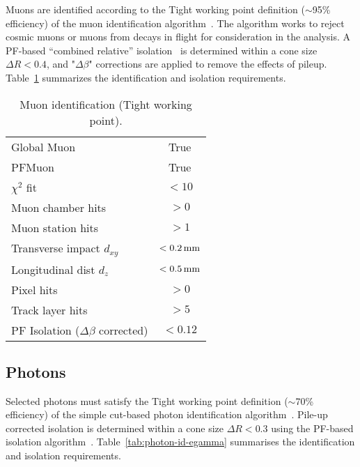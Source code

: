 Muons are identified according to the Tight working point definition
($\sim$95\% efficiency) of the muon identification
algorithm~\cite{ref:muon-id}. The algorithm works to reject cosmic muons or 
muons from decays in flight for consideration in the analysis. 
A PF-based ``combined relative'' isolation~\cite{ref:muon-id} is determined 
within a cone size $\Delta R < 0.4$, and "$\Delta\beta$" corrections 
are applied to remove the effects of pileup. Table~\ref{tab:muon-id} summarizes the
identification and isolation requirements. 

\begin{table}[h!]
  \caption{Muon identification (Tight working point).\label{tab:muon-id}}
  \centering
  \footnotesize
  \begin{tabular}{ lc }
    \hline
    \hline
    Global Muon                            & True      \\
    PFMuon                                 & True      \\
    $\chi^{2}$ fit                         & $<10$     \\
    Muon chamber hits                      & $>0$      \\
    Muon station hits                      & $>1$      \\
    Transverse impact $d_{xy}$             & $<0.2\,\text{mm}$ \\
    Longitudinal dist $d_{z}$              & $<0.5\,\text{mm}$ \\
    Pixel hits                             & $>0$      \\
    Track layer hits                       & $>5$      \\
    PF Isolation ($\Delta\beta$ corrected) & $<0.12$   \\
    \hline
    \hline
  \end{tabular}
\end{table}

\subsection{Photons}
%
Selected photons must satisfy the Tight working point definition 
($\sim$70\% efficiency) of the simple cut-based photon identification
algorithm~\cite{ref:photon-id-egamma}. Pile-up corrected isolation is 
determined within a cone size $\Delta R < 0.3$ using the PF-based 
isolation algorithm~\cite{ref:photon-id-egamma}. 
Table~\ref{tab:photon-id-egamma} summarises the identification
and isolation requirements. 

